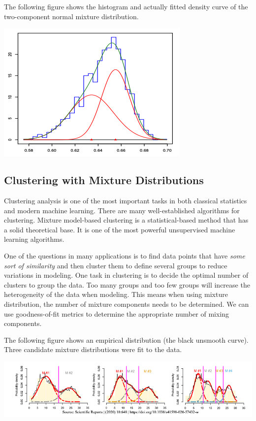 \documentclass[
]{book}
\begin{document}
The following figure shows the histogram and actually fitted density curve of the two-component normal mixture distribution.

\begin{center}\includegraphics[width=0.5\linewidth]{topic04/PearsonCrabData} \end{center}

\hypertarget{clustering-with-mixture-distributions}{%
\subsection{Clustering with Mixture Distributions}\label{clustering-with-mixture-distributions}}

Clustering analysis is one of the most important tasks in both classical statistics and modern machine learning. There are many well-established algorithms for clustering. Mixture model-based clustering is a statistical-based method that has a solid theoretical base. It is one of the most powerful unsupervised machine learning algorithms.

One of the questions in many applications is to find data points that have \emph{some sort of similarity} and then cluster them to define several groups to reduce variations in modeling. One task in clustering is to decide the optimal number of clusters to group the data. Too many groups and too few groups will increase the heterogeneity of the data when modeling. This means when using mixture distribution, the number of mixture components needs to be determined. We can use goodness-of-fit metrics to determine the appropriate number of mixing components.

The following figure shows an empirical distribution (the black unsmooth curve). Three candidate mixture distributions were fit to the data.

\begin{center}\includegraphics[width=1\linewidth]{topic04/Clustering} \end{center}
\end{document}
